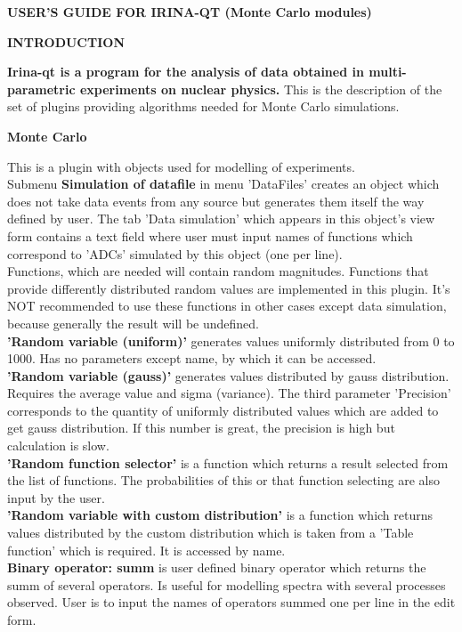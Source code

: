 \documentclass[a4paper]{article}
\begin{document}
\begin{center}{\textbf{\Large USER'S GUIDE FOR IRINA-QT (Monte Carlo modules)}}\end{center}
%
\begin{center}\textbf{INTRODUCTION}\end{center}
{
\textbf{Irina-qt is a program for the analysis of data obtained in multi-parametric experiments on nuclear physics.} 
This is the description of the set of plugins providing algorithms needed for Monte Carlo simulations.
}

\begin{center}\textbf{\hypertarget{simulation}{Monte Carlo}}\end{center}
{
This is a plugin with objects used for modelling of experiments.
\\
Submenu \textbf{Simulation of datafile} in menu 'DataFiles' creates an object which does not take data events from any source but generates them itself the way defined by user.
The tab 'Data simulation' which appears in this object's view form contains a text field where user must input names of {functions} which correspond to {'ADCs'} simulated by this object (one per line).
\\
Functions, which are needed will contain random magnitudes.
Functions that provide differently distributed random values are implemented in this plugin.
It's NOT recommended to use these functions in other cases except data simulation, because generally the result will be undefined.
\\
\textbf{'Random variable (uniform)'} generates values uniformly distributed from 0 to 1000. 
Has no parameters except name, by which it can be accessed.
\\
\textbf{'Random variable (gauss)'} generates values distributed by gauss distribution. 
Requires the average value and sigma (variance). 
The third parameter 'Precision' corresponds to the quantity of uniformly distributed values which are added to get gauss distribution.
If this number is great, the precision is high but calculation is slow.
\\
\textbf{'Random function selector'} is a function which returns a result selected from the list of functions. 
The probabilities of this or that function selecting are also input by the user.
\\
\textbf{'Random variable with custom distribution'} is a function which returns values distributed by the custom distribution which is taken from a 'Table function' which is required.
It is accessed by name.
\\
\textbf{Binary operator: summ} is user defined {binary operator} which returns the summ of several operators. 
Is useful for modelling spectra with several processes observed.
User is to input the names of operators summed one per line in the edit form.
}
\end{document}

